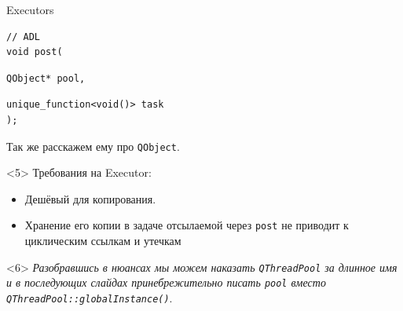 \documentclass[aspectratio=169,hyperref={unicode},17pt]{beamer}
\begin{document}
\begin{frame}[fragile,t]{Executors}
\begin{onlyenv}
\begin{lstlisting}[style=cppcode,aboveskip=0pt,belowskip=0pt]
// ADL
void post(
\end{lstlisting}
\begin{lstlisting}[style=cppcode,backgroundcolor=\color{gray!30},aboveskip=0pt,belowskip=0pt]
  QObject* pool,
\end{lstlisting}
\begin{lstlisting}[style=cppcode,aboveskip=0pt,belowskip=0pt]
  unique_function<void()> task
);
\end{lstlisting}
Так же расскажем ему про \texttt{QObject}.
\end{onlyenv}
\begin{onlyenv}<5>
Требования на Executor:
\begin{itemize}
 \item Дешёвый для копирования.
 \item Хранение его копии в задаче отсылаемой через \texttt{post} не приводит к циклическим ссылкам и утечкам
\end{itemize}
\end{onlyenv}
\begin{onlyenv}<6>
\textit{\footnotesize{Разобравшись в нюансах мы можем наказать \texttt{QThreadPool} за длинное имя и в последующих слайдах принебрежительно писать \texttt{pool} вместо \texttt{QThreadPool::globalInstance()}}}.
\end{onlyenv}
\end{frame}
\end{document}
